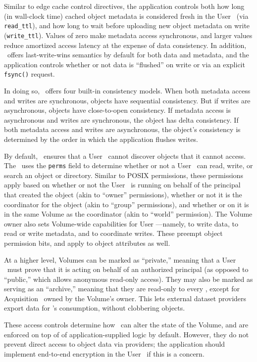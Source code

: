 Similar to edge cache control directives, the application controls both
how long (in wall-clock time) cached object metadata
is considered fresh in the User \SG\ (via \texttt{read\_ttl}), and how long to wait before uploading 
new object metadata on write (\texttt{write\_ttl}).  Values of zero make 
metadata access synchronous, and larger values reduce amortized access latency at the 
expense of data consistency.  In addition, \Syndicate\ offers last-write-wins
semantics by default for both data and metadata, and the application
controls whether or not data is ``flushed''
on write or via an explicit \texttt{fsync()} request.

In doing so, \Syndicate\ offers four built-in consistency models.
When both metadata access and writes are synchronous,
objects have sequential consistency.  But if writes are asynchronous, 
objects have close-to-open consistency.  If metadata access is asynchronous and
writes are synchronous, the object has delta consistency.
If both metadata access and writes are asynchronous, 
the object's consistency is determined
by the order in which the application flushes writes.

By default, \Syndicate\ ensures that a User \SG\ cannot 
discover objects that it cannot access.  The \MS\ uses the
\texttt{perms} field to determine whether or not a User \SG\ can read, write, or search
an object or directory.  Similar to POSIX permissions, these permissions apply based on whether or not 
the User \SG\ is running on behalf of the principal that created the object (akin to ``owner'' permissions),
whether or not it is the coordinator for the object (akin to ``group'' permissions), and
whether or on it is in the same Volume as the coordinator (akin to ``world'' permission).  The Volume owner also sets
Volume-wide capabilities for User \SGs---namely, to write data, to
read or write metadata, and to coordinate writes.  These preempt object permission bits,
and apply to object attributes as well.

At a higher level, Volumes can be marked as ``private,'' meaning that a User \SG\ must prove that
it is acting on behalf of an authorized principal (as opposed to ``public,'' which 
allows anonymous read-only access).  They may also be marked as serving as an 
``archive,'' meaning that they are read-only to every \SG, except for
Acquisition \SGs\ owned by the Volume's owner.  This lets
external dataset providers export data for \Syndicate's consumption, without 
clobbering objects.

These access controls determine how \SGs\ can alter the state of the Volume,
and are enforced on top of of application-supplied logic by default.
However, they do not prevent direct access to object data via providers;
the application should implement end-to-end encryption in the User \SG\ if this 
is a concern.

